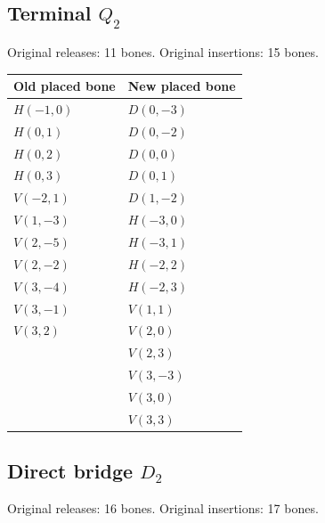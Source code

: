 \documentclass[
  11pt,
]{article}
\begin{document}

\subsection{\texorpdfstring{Terminal
\(Q_2\)}{Terminal Q\_2}}\label{terminal-q_2}

Original releases: 11 bones. Original insertions: 15 bones.

\begin{longtable}[]{@{}ll@{}}
\toprule\noalign{}
Old placed bone & New placed bone \\
\midrule\noalign{}
\endhead
\bottomrule\noalign{}
\endlastfoot
\(H(-1,0)\) & \(D(0,-3)\) \\
\(H(0,1)\) & \(D(0,-2)\) \\
\(H(0,2)\) & \(D(0,0)\) \\
\(H(0,3)\) & \(D(0,1)\) \\
\(V(-2,1)\) & \(D(1,-2)\) \\
\(V(1,-3)\) & \(H(-3,0)\) \\
\(V(2,-5)\) & \(H(-3,1)\) \\
\(V(2,-2)\) & \(H(-2,2)\) \\
\(V(3,-4)\) & \(H(-2,3)\) \\
\(V(3,-1)\) & \(V(1,1)\) \\
\(V(3,2)\) & \(V(2,0)\) \\
& \(V(2,3)\) \\
& \(V(3,-3)\) \\
& \(V(3,0)\) \\
& \(V(3,3)\) \\
\end{longtable}


\subsection{\texorpdfstring{Direct bridge
\(D_2\)}{Direct bridge D\_2}}\label{direct-bridge-d_2}

Original releases: 16 bones. Original insertions: 17 bones.
\end{document}
